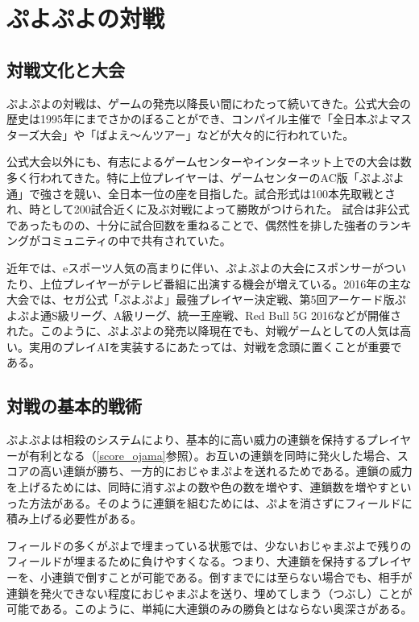 \documentclass[12pt]{jarticle}
\begin{document}
\section{ぷよぷよの対戦}
\subsection{対戦文化と大会}
ぷよぷよの対戦は、ゲームの発売以降長い間にわたって続いてきた。公式大会の歴史は1995年にまでさかのぼることができ、コンパイル主催で「全日本ぷよマスターズ大会」や「ばよえ～んツアー」などが大々的に行われていた。

公式大会以外にも、有志によるゲームセンターやインターネット上での大会は数多く行われてきた。特に上位プレイヤーは、ゲームセンターのAC版「ぷよぷよ通」で強さを競い、全日本一位の座を目指した。試合形式は100本先取戦とされ、時として200試合近くに及ぶ対戦によって勝敗がつけられた。
試合は非公式であったものの、十分に試合回数を重ねることで、偶然性を排した強者のランキングがコミュニティの中で共有されていた。

近年では、eスポーツ人気の高まりに伴い、ぷよぷよの大会にスポンサーがついたり、上位プレイヤーがテレビ番組に出演する機会が増えている。2016年の主な大会では、セガ公式「ぷよぷよ」最強プレイヤー決定戦\cite{sega}、第5回アーケード版ぷよぷよ通S級リーグ\cite{Skyuu}、A級リーグ\cite{Akyuu}、統一王座戦\cite{touituouza}、Red Bull 5G 2016\cite{5g}などが開催された。このように、ぷよぷよの発売以降現在でも、対戦ゲームとしての人気は高い。実用のプレイAIを実装するにあたっては、対戦を念頭に置くことが重要である。

\subsection{対戦の基本的戦術} \label{senzyutu}
ぷよぷよは相殺のシステムにより、基本的に高い威力の連鎖を保持するプレイヤーが有利となる（\ref{score_ojama}参照）。お互いの連鎖を同時に発火した場合、スコアの高い連鎖が勝ち、一方的におじゃまぷよを送れるためである。連鎖の威力を上げるためには、同時に消すぷよの数や色の数を増やす、連鎖数を増やすといった方法がある。そのように連鎖を組むためには、ぷよを消さずにフィールドに積み上げる必要性がある。

フィールドの多くがぷよで埋まっている状態では、少ないおじゃまぷよで残りのフィールドが埋まるために負けやすくなる。つまり、大連鎖を保持するプレイヤーを、小連鎖で倒すことが可能である。倒すまでには至らない場合でも、相手が連鎖を発火できない程度におじゃまぷよを送り、埋めてしまう（つぶし）ことが可能である。このように、単純に大連鎖のみの勝負とはならない奥深さがある。
\end{document}
